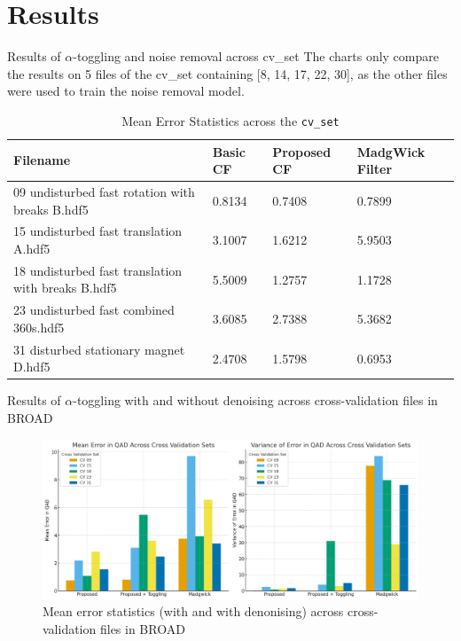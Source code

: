 \documentclass[aspectratio=169,xcolor=dvipsnames]{beamer}
\begin{document}
\section{Results}

\begin{frame}{Results of $\alpha$-toggling and noise removal across cv_set}
\small
The charts only compare the results on 5 files of the cv\_set containing [8, 14, 17, 22, 30], as the other files were used to train the noise removal model.
\begin{table}[H]
\centering
\caption{Mean Error Statistics across the \texttt{cv\_set}}
\label{tab:error_statistics_cvset_mean}
    \begin{tabular}{|p{}|p{}|p{}|p{}|}
    \hline
    \textbf{Filename} & \textbf{Basic CF} & \textbf{Proposed CF} & \textbf{ MadgWick Filter} \\
    \hline
    09 undisturbed fast rotation with breaks B.hdf5 & 0.8134 & 0.7408 & 0.7899 \\
    \hline
    15 undisturbed fast translation A.hdf5 & 3.1007 & 1.6212 & 5.9503 \\
    \hline
    18 undisturbed fast translation with breaks B.hdf5 & 5.5009 & 1.2757 & 1.1728 \\
    \hline
    23 undisturbed fast combined 360s.hdf5 & 3.6085 & 2.7388 & 5.3682 \\
    \hline
    31 disturbed stationary magnet D.hdf5 & 2.4708 & 1.5798 & 0.6953 \\
    \hline
    \end{tabular}
\end{table}
    
\end{frame}

\begin{frame}{Results of $\alpha$-toggling with and without denoising across cross-validation files in BROAD}
\small

\begin{figure}
    \centering
    \includegraphics[width=\linewidth,height=0.65\textheight,keepaspectratio]{logos/barchart_correct_slide.png}
    \caption{Mean error statistics (with and with denonising) across cross-validation files in BROAD}
    \label{fig:rmnoise_chart}
\end{figure}
\hfill
\end{frame}
\end{document}
